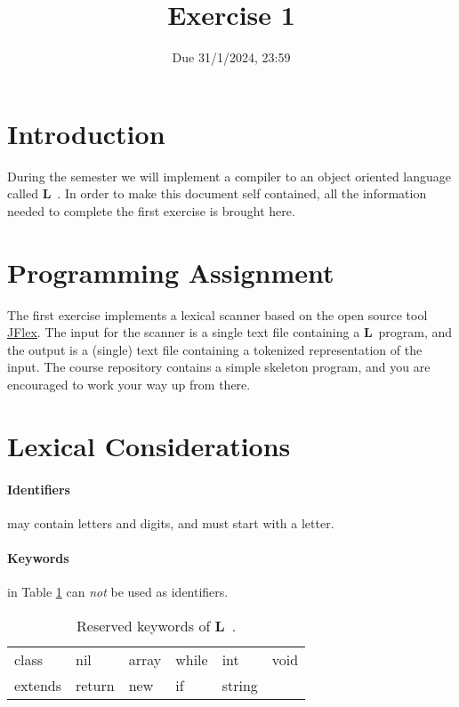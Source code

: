 \documentclass{article}
\begin{document}
\title{Exercise 1}


\date{Due 31/1/2024, 23:59}

\maketitle

\newcommand{\plname}{\textbf{L}\ }

\section{Introduction}
During the semester we will implement a compiler to an object oriented language called \plname.
In order to make this document self contained,
all the information needed to complete the first exercise is brought here.

\section{Programming Assignment}
The first exercise implements a lexical scanner based on the
open source tool \href{http://jflex.de/}{JFlex}.
The input for the scanner is a single text file containing a \plname program,
and the output is a (single) text file containing a tokenized representation of the input.
The course repository contains a simple skeleton program,
and you are encouraged to work your way up from there.

\section{Lexical Considerations}
\paragraph{Identifiers} may contain letters and digits, and must start with a letter.
\paragraph{Keywords} in Table \ref{Table_Reserved_Keywords} can \textit{not}
be used as identifiers.
\begin{table}[h]
\centering
\begin{tabular}{l l l l l l}
class & nil & array & while & int & void \\
extends & return & new & if & string \\
\end{tabular}
\caption{
Reserved keywords of \plname.
\label{Table_Reserved_Keywords}}
\end{table}
\end{document}
